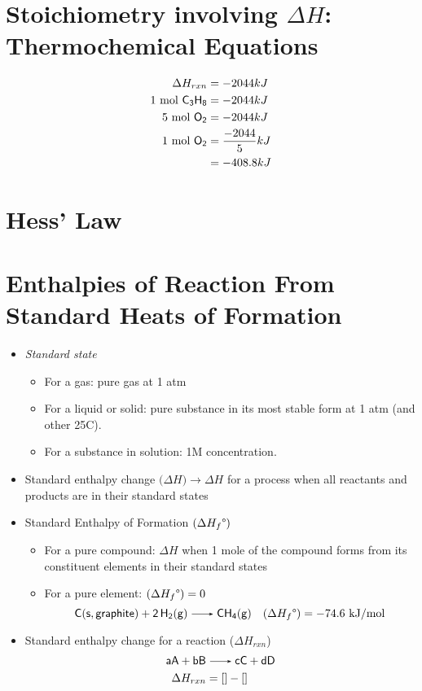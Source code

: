 \documentclass[
	chapter=6,
	title={Thermochemistry},
	showanswers=true,
]{chem122notes}
\begin{document}
\section{Stoichiometry involving $\Delta H$: Thermochemical Equations}\label{sec:stoichiometry-involving-$delta-h$:-thermochemical-equations}
\begin{equation*}
\begin{aligned}
	\Delta H_{rxn} &= -2044 kJ\\
	1 \mbox{ mol } \ce{C3H8} &= -2044 kJ\\
	5 \mbox{ mol } \ce{O2} &= -2044 kJ\\
	1 \mbox{ mol } \ce{O2} &= \frac{-2044}{5} kJ\\
	 &= -408.8 kJ\\
\end{aligned}
\end{equation*}

\section{Hess' Law}\label{sec:hess'-law}

\section{Enthalpies of Reaction From Standard Heats of Formation}\label{sec:enthalpies-of-reaction-from-standard-heats-of-formation}
\begin{itemize}
	\item \emph{Standard state}
	\begin{itemize}
		\item For a gas: pure gas at 1 atm
		\item For a liquid or solid: pure substance in its most stable form at 1 atm (and other 25\textdegree{}C).
		\item For a substance in solution: 1M concentration.
	\end{itemize}
	\item Standard enthalpy change $(\Delta H$\textdegree$) \rightarrow \Delta H$ for a process when all reactants and products are in their standard states
	\item Standard Enthalpy of Formation $(\Delta H_{f}\mbox{\textdegree})$
	\begin{itemize}
		\item For a pure compound: $\Delta H$ when 1 mole of the compound forms from its constituent elements in their standard states
		\item For a pure element: $(\Delta H_{f}\mbox{\textdegree}) = 0$
		\[ \ce{C(s, graphite) + 2H2(g) -> CH4(g)}\ \ \ \hf = -74.6 \mbox{ kJ/mol} \]
	\end{itemize}
	\item Standard enthalpy change for a reaction ($\Delta H_{rxn}$)
	\begin{equation*}
	\begin{aligned}
		\ce{aA + bB} &\ce{-> cC + dD}\\
		\Delta H_{rxn} &= \left[  \right] - \left[  \right]\\
	\end{aligned}
	\end{equation*}
\end{itemize}
\end{document}
